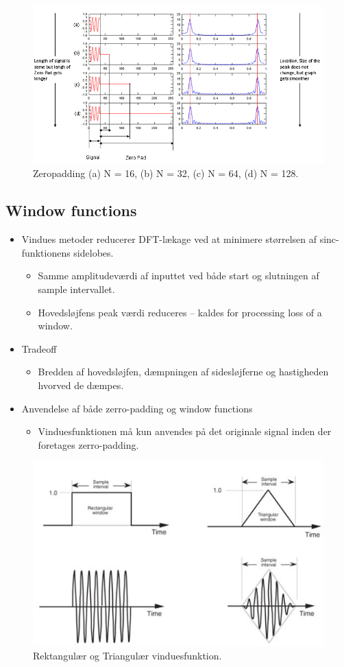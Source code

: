 \documentclass[danish]{article}
\begin{document}
\begin{figure}[H]
	\centering
	\includegraphics[width=0.8\linewidth]{graphics/zeropadding}
	\caption{Zeropadding (a) N = 16, (b) N = 32, (c) N = 64, (d) N = 128.}
	\label{fig:zeropadding}
\end{figure}

\subsection{Window functions}
\begin{itemize}
	\item Vindues metoder reducerer DFT-lækage ved at minimere størrelsen af sinc-funktionens sidelobes.
­	\begin{itemize}
		\item 	Samme amplitudeværdi af inputtet ved både start og slutningen af sample intervallet. 
­		\item Hovedsløjfens peak værdi reduceres – kaldes for processing loss of a window. 
	\end{itemize}
	\item Tradeoff
­	\begin{itemize}
		\item 	Bredden af hovedsløjfen, dæmpningen af sidesløjferne og hastigheden hvorved de dæmpes.
	\end{itemize}
	\item Anvendelse af både zerro-padding og window functions
­	\begin{itemize}
		\item Vinduesfunktionen må kun anvendes på det originale signal inden der foretages zerro-padding.
	\end{itemize}
\end{itemize}

\begin{figure}[H]
	\centering
	\includegraphics[width=0.6\linewidth]{graphics/windows}
	\caption{Rektangulær og Triangulær vinduesfunktion.}
	\label{fig:windows}
\end{figure}
\end{document}
